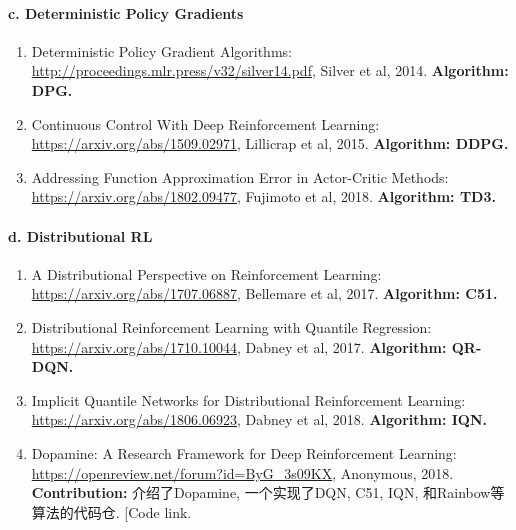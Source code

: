 \documentclass[lang=cn,11pt,a4paper]{eleganttemplate}
\begin{document}
\paragraph{c. Deterministic Policy Gradients}
\begin{enumerate}
    \item Deterministic Policy Gradient Algorithms:\\ \href{http://proceedings.mlr.press/v32/silver14.pdf}{http://proceedings.mlr.press/v32/silver14.pdf}, Silver et al, 2014. \textbf{Algorithm: DPG.}
    \item Continuous Control With Deep Reinforcement Learning:\\ \href{https://arxiv.org/abs/1509.02971}{https://arxiv.org/abs/1509.02971}, Lillicrap et al, 2015. \textbf{Algorithm: DDPG.}
    \item Addressing Function Approximation Error in Actor-Critic Methods:\\ \href{https://arxiv.org/abs/1802.09477}{https://arxiv.org/abs/1802.09477}, Fujimoto et al, 2018. \textbf{Algorithm: TD3.}
\end{enumerate}

\paragraph{d. Distributional RL}
\begin{enumerate}
    \item A Distributional Perspective on Reinforcement Learning:\\ \href{https://arxiv.org/abs/1707.06887}{https://arxiv.org/abs/1707.06887}, Bellemare et al, 2017. \textbf{Algorithm: C51.}
    \item Distributional Reinforcement Learning with Quantile Regression:\\ \href{https://arxiv.org/abs/1710.10044}{https://arxiv.org/abs/1710.10044}, Dabney et al, 2017. \textbf{Algorithm: QR-DQN.}
    \item Implicit Quantile Networks for Distributional Reinforcement Learning:\\ \href{https://arxiv.org/abs/1806.06923}{https://arxiv.org/abs/1806.06923}, Dabney et al, 2018. \textbf{Algorithm: IQN.}
    \item Dopamine: A Research Framework for Deep Reinforcement Learning:\\ \href{https://openreview.net/forum?id=ByG_3s09KX}{https://openreview.net/forum?id=ByG\_3s09KX}, Anonymous, 2018. \textbf{Contribution:} 介绍了Dopamine, 一个实现了DQN, C51, IQN, 和Rainbow等算法的代码仓. [Code link.
\end{enumerate}
\end{document}
